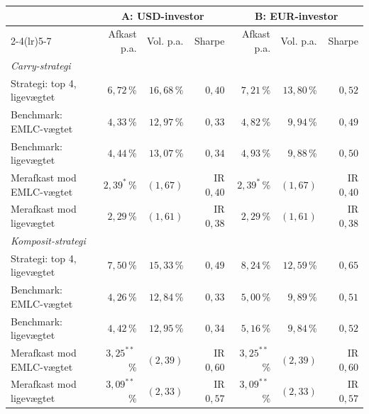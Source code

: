 \begin{tabular}{lrrrrrr}
\toprule
 & \multicolumn{3}{c}{A: USD-investor} & \multicolumn{3}{c}{B: EUR-investor} \\
\cmidrule(lr){2-4}\cmidrule(lr){5-7}
 & Afkast p.a. & Vol. p.a. & Sharpe & Afkast p.a. & Vol. p.a. & Sharpe \\
\midrule
\multicolumn{7}{l}{\textit{Carry-strategi}} \\
\quad Strategi: top 4, ligevægtet & $6{,}72$\,\% & $16{,}68$\,\% & $0{,}40$ & $7{,}21$\,\% & $13{,}80$\,\% & $0{,}52$ \\
\quad Benchmark: EMLC-vægtet & $4{,}33$\,\% & $12{,}97$\,\% & $0{,}33$ & $4{,}82$\,\% & $9{,}94$\,\% & $0{,}49$ \\
\quad Benchmark: ligevægtet & $4{,}44$\,\% & $13{,}07$\,\% & $0{,}34$ & $4{,}93$\,\% & $9{,}88$\,\% & $0{,}50$ \\
\quad Merafkast mod EMLC-vægtet & $2{,}39^{*}$\,\% & $(1{,}67)$ & IR $0{,}40$ & $2{,}39^{*}$\,\% & $(1{,}67)$ & IR $0{,}40$ \\
\quad Merafkast mod ligevægtet & $2{,}29$\,\% & $(1{,}61)$ & IR $0{,}38$ & $2{,}29$\,\% & $(1{,}61)$ & IR $0{,}38$ \\
\midrule
\multicolumn{7}{l}{\textit{Komposit-strategi}} \\
\quad Strategi: top 4, ligevægtet & $7{,}50$\,\% & $15{,}33$\,\% & $0{,}49$ & $8{,}24$\,\% & $12{,}59$\,\% & $0{,}65$ \\
\quad Benchmark: EMLC-vægtet & $4{,}26$\,\% & $12{,}84$\,\% & $0{,}33$ & $5{,}00$\,\% & $9{,}89$\,\% & $0{,}51$ \\
\quad Benchmark: ligevægtet & $4{,}42$\,\% & $12{,}95$\,\% & $0{,}34$ & $5{,}16$\,\% & $9{,}84$\,\% & $0{,}52$ \\
\quad Merafkast mod EMLC-vægtet & $3{,}25^{**}$\,\% & $(2{,}39)$ & IR $0{,}60$ & $3{,}25^{**}$\,\% & $(2{,}39)$ & IR $0{,}60$ \\
\quad Merafkast mod ligevægtet & $3{,}09^{**}$\,\% & $(2{,}33)$ & IR $0{,}57$ & $3{,}09^{**}$\,\% & $(2{,}33)$ & IR $0{,}57$ \\
\bottomrule
\end{tabular}
